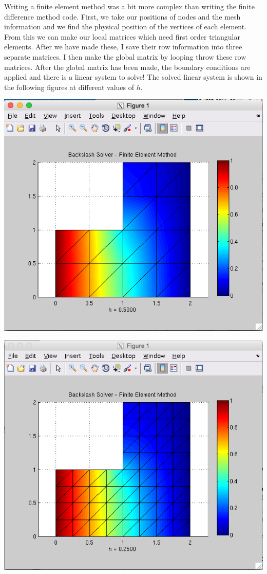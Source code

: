 \documentclass[11pt, oneside]{article}   	%
\begin{document}
Writing a finite element method was a bit more complex than writing the finite difference method code. First, we take our positions of nodes and the mesh information and we find the physical position of the vertices of each element. From this we can make our local matrices which need first order triangular elements. After we have made these, I save their row information into three separate matrices. I then make the global matrix by looping throw these row matrices. After the global matrix has been made, the boundary conditions are applied and there is a linear system to solve! The solved linear system is shown in the following figures at different values of $h$. \\

\centerline{\includegraphics[scale = 0.55]{Backslash_h1.png}}

\vspace{5mm}

\centerline{\includegraphics[scale = 0.55]{Backslash_h2.png}}
\end{document}
